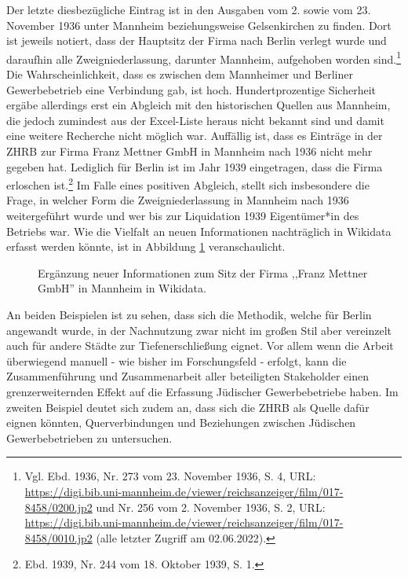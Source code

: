 Der letzte diesbezügliche Eintrag ist in den Ausgaben vom 2. sowie vom 23. November 1936 unter Mannheim beziehungsweise Gelsenkirchen zu finden. Dort ist jeweils notiert, dass der Hauptsitz der Firma nach Berlin verlegt wurde und daraufhin alle Zweigniederlassung, darunter Mannheim, aufgehoben worden sind.\footnote{Vgl. Ebd. 1936, Nr. 273 vom 23. November 1936, S. 4, URL: \url{https://digi.bib.uni-mannheim.de/viewer/reichsanzeiger/film/017-8458/0200.jp2} und Nr. 256 vom 2. November 1936, S. 2, URL: \url{https://digi.bib.uni-mannheim.de/viewer/reichsanzeiger/film/017-8458/0010.jp2} (alle letzter Zugriff am 02.06.2022).} Die Wahrscheinlichkeit, dass es zwischen dem Mannheimer und Berliner Gewerbebetrieb eine Verbindung gab, ist hoch. Hundertprozentige Sicherheit ergäbe allerdings erst ein Abgleich mit den historischen Quellen aus Mannheim, die jedoch zumindest aus der Excel-Liste heraus nicht bekannt sind und damit eine weitere Recherche nicht möglich war. Auffällig ist, dass es Einträge in der ZHRB zur Firma Franz Mettner GmbH in Mannheim nach 1936 nicht mehr gegeben hat. Lediglich für Berlin ist im Jahr 1939 eingetragen, dass die Firma erloschen ist.\footnote{Ebd. 1939, Nr. 244 vom 18. Oktober 1939, S. 1.} Im Falle eines positiven Abgleich, stellt sich insbesondere die Frage, in welcher Form die Zweigniederlassung in Mannheim nach 1936 weitergeführt wurde und wer bis zur Liquidation 1939 Eigentümer*in des Betriebs war. Wie die Vielfalt an neuen Informationen nachträglich in Wikidata erfasst werden könnte, ist in Abbildung \ref{fig:wikidatamettner} veranschaulicht. 

\begin{figure}[h]
    \centering
    \caption{Ergänzung neuer Informationen zum Sitz der Firma ,,Franz Mettner GmbH'' in Mannheim in Wikidata.}
    \label{fig:wikidatamettner}
\end{figure}

An beiden Beispielen ist zu sehen, dass sich die Methodik, welche für Berlin angewandt wurde, in der Nachnutzung zwar nicht im großen Stil aber vereinzelt auch für andere Städte zur Tiefenerschließung eignet. Vor allem wenn die Arbeit überwiegend manuell - wie bisher im Forschungsfeld - erfolgt, kann die Zusammenführung und Zusammenarbeit aller beteiligten Stakeholder einen grenzerweiternden Effekt auf die Erfassung Jüdischer Gewerbebetriebe haben. Im zweiten Beispiel deutet sich zudem an, dass sich die ZHRB als Quelle dafür eignen könnten, Querverbindungen und Beziehungen zwischen Jüdischen Gewerbebetrieben zu untersuchen.

